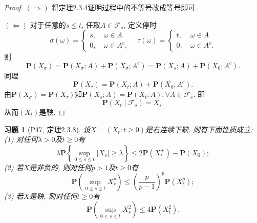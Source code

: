 \documentclass[UTF8,ondside]{ctexart}
\newtheorem{exercise}{习题}[section]
\newcommand{\h}{\mathscr}
\newcommand{\mbf}{\mathbf}
\numberwithin{equation}{section}
\begin{document}
	\begin{proof}
		$(\Rightarrow)$ 将定理2.3.4证明过程中的不等号改成等号即可.

		$(\Leftarrow)$ 对于任意的$s\leq t$, 任取$A\in \h F_s$, 定义停时
		\[
			\sigma(\omega)=\left\{
				\begin{aligned}
				s,\ & \omega \in A\\
				0,\ & \omega \in A^c,
			\end{aligned}
			\right.\ \ \ \ 
			\tau(\omega)=\left\{\begin{aligned}
				t,\ & \omega\in A\\
				0,\ & \omega\in A^c.
			\end{aligned}\right.
		\]
		则
		\[
			\mbf P(X_{\sigma})=\mbf P(X_\sigma;A)+\mbf P(X_\sigma;A^c)=\mbf P(X_s;A)+\mbf P(X_0;A^c).
		\]
		同理
		\[
			\mbf P(X_\tau)=\mbf P(X_t;A)+\mbf P(X_0;A^c).
			\]
		由$\mbf P(X_\sigma)=\mbf P(X_\tau)$知$\mbf P(X_s;A)=\mbf P(X_t;A),\forall A\in\h F_s$. 即
		\[
			\mbf P(X_t\mid\h F_s)=X_s.
		\]
		从而$(X_t)$是鞅.
	\end{proof}
	\begin{exercise}[P47, 定理2.3.8]
		设$X=(X_t:t\geq 0)$是右连续下鞅. 则有下面性质成立:\newline
		(1) 对任何$\lambda > 0$及$t\geq 0$有
		\[
			\lambda\mbf P\left\{\sup_{0\leq s\leq t}|X_s|\geq \lambda\right\}\leq 2\mbf P(X_t^+)-\mbf P(X_0);
		\]
		(2) 若$X$是非负的, 则对任何$p>1$及$t\geq 0$有
		\[
			\mbf P\left(\sup_{0\leq s\leq t}X_s^p\right)\leq \left( \frac{p}{p-1} \right)^p\mbf P(X_t^p);
		\]
		(3) 若$X$是鞅, 则对任何$t\geq 0$有
		\[
			\mbf P\left(\sup_{0\leq s\leq t}X_s^2\right)\leq 4\mbf P(X_t^2).
		\]
	\end{exercise}
\end{document}
